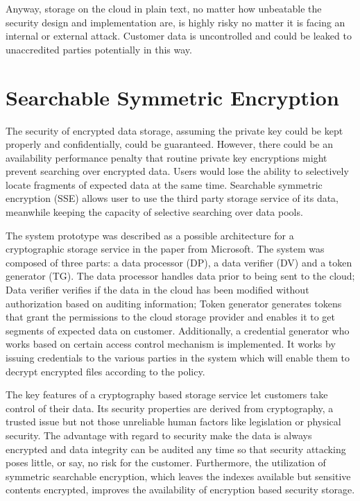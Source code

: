 Anyway, storage on the cloud in plain text, no matter how unbeatable the security design and implementation are, is highly risky no matter it is facing an internal or external attack. Customer data is uncontrolled and could be leaked to unaccredited parties potentially in this way\cite{Uppalli2003}.

\section{Searchable Symmetric Encryption}

The security of encrypted data storage, assuming the private key could be kept properly and confidentially, could be guaranteed. However, there could be an availability performance penalty that routine private key encryptions might prevent searching over encrypted data. Users would lose the ability to selectively locate fragments of expected data at the same time\cite{Kamara2010}\cite{Xiaodong2000}. Searchable symmetric encryption (SSE) allows user to use the third party storage service of its data, meanwhile keeping the capacity of selective searching over data pools\cite{Curtmola2006}.

The system prototype was described as a possible architecture for a cryptographic storage service in the paper from Microsoft\cite{Curtmola2006}. The system was composed of three parts: a data processor (DP), a data verifier (DV) and a token generator (TG). The data processor handles data prior to being sent to the cloud; Data verifier verifies if the data in the cloud has been modified without authorization based on auditing information; Token generator generates tokens that grant the permissions to the cloud storage provider and enables it to get segments of expected data on customer. Additionally, a credential generator who works based on certain access control mechanism is implemented. It works by issuing credentials to the various parties in the system which will enable them to decrypt encrypted files according to the policy.

The key features of a cryptography based storage service let customers take control of their data. Its security properties are derived from cryptography, a trusted issue but not those unreliable human factors like legislation or physical security. The advantage with regard to security make the data is always encrypted and data integrity can be audited any time so that security attacking poses little, or say, no risk for the customer\cite{Kamara2010}. Furthermore, the utilization of symmetric searchable encryption, which leaves the indexes available but sensitive contents encrypted, improves the availability of encryption based security storage.

